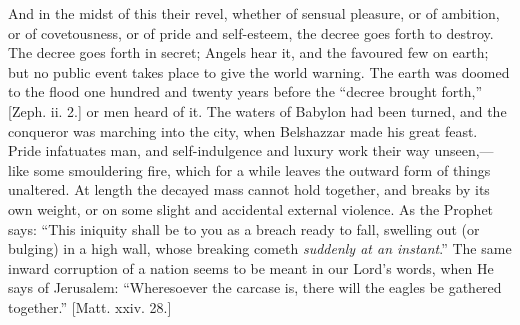 And in the midst of this their revel, whether of sensual pleasure, or
of ambition, or of covetousness, or of pride and self-esteem, the decree
goes forth to destroy. The decree goes forth in secret; Angels hear it,
and the favoured few on earth; but no public event takes place to give
the world warning. The earth was doomed to the flood one hundred and
twenty years before the ``decree brought forth,'' [Zeph. ii. 2.]
or men heard of it. The waters of Babylon had been turned, and the
conqueror was marching into the city, when Belshazzar made his great
feast. Pride infatuates man, and self-indulgence and luxury work their
way unseen,—like some smouldering fire, which for a while leaves the
outward form of things unaltered. At length the decayed mass cannot hold
together, and breaks by its own weight, or on some slight and accidental
external violence. As the Prophet says: ``This iniquity shall be to
you as a breach ready to fall, swelling out (or bulging) in a high wall,
whose breaking cometh \emph{suddenly at an instant}.'' The same
inward corruption of a nation seems to be meant in our Lord's words,
when He says of Jerusalem: ``Wheresoever the carcase is, there will
the eagles be gathered together.'' [Matt. xxiv. 28.]

